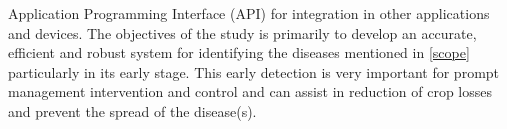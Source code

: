 {\begin{enumerate}
	

\end{enumerate}


Application Programming Interface (API) for integration in other applications and
devices.
The objectives of the study is primarily to develop an accurate, efficient
and robust system for identifying the diseases mentioned in \ref{scope} particularly in its early stage. This early detection is very important for prompt
management intervention and control and can assist in reduction of crop
losses and prevent the spread of the disease(s).



	
	


}
